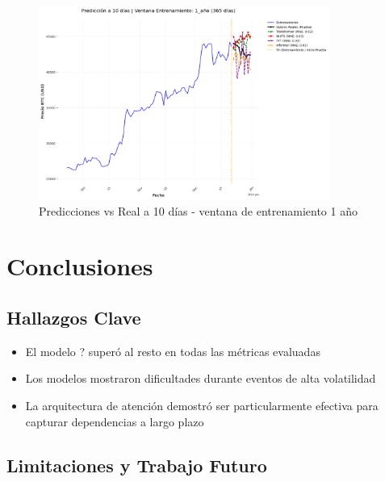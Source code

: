 \documentclass[12pt]{article}
\begin{document}
\begin{figure}[H]
\centering
\includegraphics[width=0.85\textwidth]{./results/prediccion_10_dias_ventana_1_anio.png}
\caption{Predicciones vs Real a 10 días - ventana de entrenamiento 1 año}
\label{prediccion_un_anio}
\end{figure}




\newpage
\section{Conclusiones}
\label{sec:conclusiones}

\subsection{Hallazgos Clave}

\begin{itemize}
\item El modelo ? superó al resto en todas las métricas evaluadas %
\item Los modelos mostraron dificultades durante eventos de alta volatilidad
\item La arquitectura de atención demostró ser particularmente efectiva para capturar dependencias a largo plazo
\end{itemize}

\subsection{Limitaciones y Trabajo Futuro}
\end{document}
